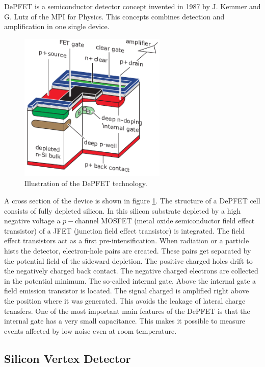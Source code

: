 \documentclass[a4paper,11pt,twosided,final,german,openbib,pdftex,listof=totoc,bibliography=totoc]{scrbook}
\begin{document}
DePFET is a semiconductor detector concept invented in 1987 by J. Kemmer and G. Lutz of the MPI for Physics. This concepts combines detection and amplification in one single device. \cite{B2TR}

\begin{figure}[h!]
	\begin{center}
		\includegraphics[width=7cm]{Bilder/DEPFET}
	\end{center}
\caption[DePFET]{Illustration of the DePFET technology.\cite{B2TR}}
\label{fig:DePFET}
\end{figure}

A cross section of the device is shown in figure \ref{fig:DePFET}. The structure of a DePFET cell consists of fully depleted silicon. In this silicon substrate depleted by a high negative voltage a $p-$channel MOSFET (metal oxide semiconductor field effect transistor) of a JFET (junction field effect transistor) is integrated. The field effect transistors act as a first pre-intensification. When radiation or a particle hists the detector, electron-hole pairs are created. These pairs get separated by the potential field of the sideward depletion. The positive charged holes drift to the negatively charged back contact. The negative charged electrons are collected in the potential minimum. The so-called internal gate. Above the internal gate a field emission transistor is located. The signal charged is amplified right above the position where it was generated. This avoids the leakage of lateral charge transfers. One of the most important main features of the DePFET is that the internal gate has a very small capacitance. This makes it possible to measure events affected by low noise even at room temperature.\cite{B2TR}

\subsection{Silicon Vertex Detector}
\label{sec:Silicon}
\end{document}
